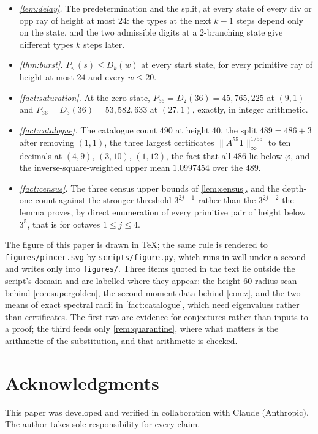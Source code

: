\documentclass[11pt]{amsart}
\theoremstyle{definition}
\theoremstyle{remark}
\begin{document}
\begin{itemize}
  \item \emph{\cref{lem:delay}.} The predetermination and the split, at every state of every div or opp ray of height at most $24$: the types at the next $k-1$ steps depend only on the state, and the two admissible digits at a $2$-branching state give different types $k$ steps later.
  \item \emph{\cref{thm:burst}.} $P_w(s) \le D_k(w)$ at every start state, for every primitive ray of height at most $24$ and every $w \le 20$.
  \item \emph{\cref{fact:saturation}.} At the zero state, $P_{36} = D_2(36) = 45{,}765{,}225$ at $(9,1)$ and $P_{36} = D_3(36) = 53{,}582{,}633$ at $(27,1)$, exactly, in integer arithmetic.
  \item \emph{\cref{fact:catalogue}.} The catalogue count $490$ at height $40$, the split $489 = 486 + 3$ after removing $(1,1)$, the three largest certificates $\|A^{55}\mathbf 1\|_\infty^{1/55}$ to ten decimals at $(4,9)$, $(3,10)$, $(1,12)$, the fact that all $486$ lie below $\varphi$, and the inverse-square-weighted upper mean $1.0997454$ over the $489$.
  \item \emph{\cref{fact:census}.} The three census upper bounds of \cref{lem:census}, and the depth-one count against the stronger threshold $3^{2j-1}$ rather than the $3^{2j-2}$ the lemma proves, by direct enumeration of every primitive pair of height below $3^{5}$, that is for octaves $1 \le j \le 4$.
\end{itemize}

The figure of this paper is drawn in \TeX; the same rule is rendered to \texttt{figures/pincer.svg} by \texttt{scripts/figure.py}, which runs in well under a second and writes only into \texttt{figures/}. Three items quoted in the text lie outside the script's domain and are labelled where they appear: the height-$60$ radius scan behind \cref{con:supergolden}, the second-moment data behind \cref{con:z}, and the two means of exact spectral radii in \cref{fact:catalogue}, which need eigenvalues rather than certificates. The first two are evidence for conjectures rather than inputs to a proof; the third feeds only \cref{rem:quarantine}, where what matters is the arithmetic of the substitution, and that arithmetic is checked.

\section*{Acknowledgments}

This paper was developed and verified in collaboration with Claude (Anthropic). The author takes sole responsibility for every claim.
\end{document}
